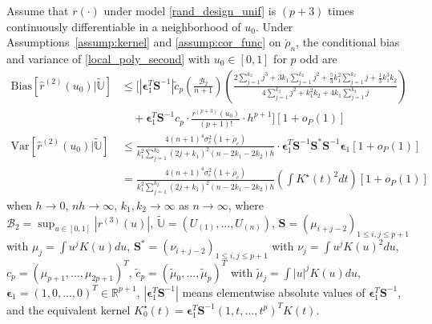 \documentclass{uwstat572}
\theoremstyle{definition}
\renewcommand{\hat}{\widehat}
\renewcommand{\tilde}{\widetilde}
\theoremstyle{theorem}
\newenvironment{customthm}[1]
{\renewcommand\theinnercustomthm{#1}\innercustomthm}
{\endinnercustomthm}
\begin{document}
\begin{customthm}{7}[Theorem 4 in \citealt{liu2020smoothed}]
Assume that $r(\cdot)$ under model \eqref{rand_design_unif} is $(p+3)$ times continuously differentiable in a neighborhood of $u_0$. Under Assumptions~\ref{assump:kernel} and \ref{assump:cor_func} on $\acute{\rho}_n$, the conditional bias and variance of \eqref{local_poly_second} with $u_0\in [0,1]$ for $p$ odd are
\begin{align*}
	\mathrm{Bias}\left[\hat{r}^{(2)}(u_0) | \tilde{\mathbb{U}}\right] &\leq \Bigg[\left|\bm{\epsilon}_1^T \bm{S}^{-1} \right|\tilde{c}_p \left(\frac{\mathcal{B}_2}{n+1}\right) \left(\frac{2\sum_{j=1}^{k_2} j^3 + 3k_1 \sum_{j=1}^{k_2} j^2 + \frac{5}{3} k_1^2 \sum_{j=1}^{k_2}j + \frac{1}{3} k_1^3k_2}{4 \sum_{j=1}^{k_2}j^2 + k_1^2k_2 + 4k_1\sum_{j=1}^{k_2} j} \right)\\
	&\quad + \bm{\epsilon}_1^T \bm{S}^{-1} c_p \cdot \frac{r^{(p+3)}(u_0)}{(p+1)!}\cdot h^{p+1} \Bigg] \left[1+o_P(1)\right]\\
	\mathrm{Var}\left[\hat{r}^{(2)}(u_0) | \tilde{\mathbb{U}}\right] &\leq \frac{4(n+1)^4\sigma_e^2(1+\acute{\rho}_c)}{k_1^2 \sum_{j=1}^{k_2}(2j+k_1)^2 (n-2k_1-2k_2) h}\cdot \bm{\epsilon}_1^T \bm{S}^{-1}\bm{S}^*\bm{S}^{-1}\bm{\epsilon}_1 \left[1+o_P(1)\right]\\
	&= \frac{4(n+1)^4\sigma_e^2(1+\acute{\rho}_c)}{k_1^2 \sum_{j=1}^{k_2}(2j+k_1)^2 (n-2k_1-2k_2) h} \left(\int K^{\star}(t)^2 dt\right) \left[1+o_P(1)\right]
\end{align*}
when $h\to 0$, $nh\to \infty$, $k_1,k_2\to \infty$ as $n\to \infty$, where $\mathcal{B}_2=\sup_{u\in [0,1]}\left|r^{(3)}(u)\right|$, $\tilde{\mathbb{U}}=\left(U_{(1)},...,U_{(n)}\right)$, $\bm{S}=\left(\mu_{i+j-2}\right)_{1\leq i,j\leq p+1}$ with $\mu_j=\int u^j K(u) du$, $\bm{S}^*=\left(\nu_{i+j-2}\right)_{1\leq i,j\leq p+1}$ with $\nu_j = \int u^j K(u)^2 du$, $c_p=\left(\mu_{p+1},...,\mu_{2p+1} \right)^T$, $\tilde{c}_p=\left(\tilde{\mu}_0,...,\tilde{\mu}_{p} \right)^T$ with $\tilde{\mu}_j=\int |u|^j K(u) du$, $\bm{\epsilon}_1=(1,0,...,0)^T \in \mathbb{R}^{p+1}$, $\left|\bm{\epsilon}_1^T\bm{S}^{-1}\right|$ means elementwise absolute values of $\bm{\epsilon}_1^T\bm{S}^{-1}$, and the equivalent kernel $K_0^{\star}(t) = \bm{\epsilon}_1^T \bm{S}^{-1} \left(1,t,...,t^p\right)^T K(t)$.
\end{customthm}
\end{document}
